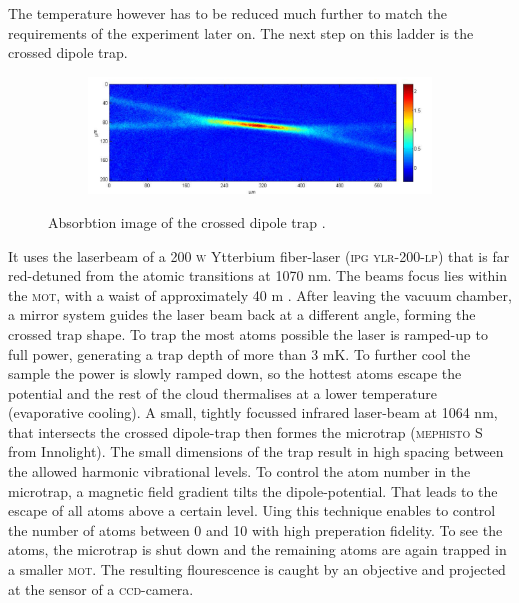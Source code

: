 The temperature however has to be reduced much further to match the requirements of the experiment later on. The next step on this ladder is the crossed dipole trap. \begin{figure}[h]
\centering
\begin{subfigure}[b]{0.8\textwidth}
                \includegraphics[width=\textwidth]{dipolefoto}
\end{subfigure}
\caption{Absorbtion image of the crossed dipole trap \cite{lompe}.}
\label{experiment}
\end{figure}
It uses the laserbeam of a 200 \textsc{w} Ytterbium fiber-laser (\textsc{ipg ylr-200-lp}) that is far red-detuned from the atomic transitions at 1070 nm. The beams focus lies within the \textsc{mot}, with a waist of approximately 40 \mu m \cite{lompe}. After leaving the vacuum chamber, a mirror system guides the laser beam back at a different angle, forming the crossed trap shape. To trap the most atoms possible the laser is ramped-up to full power, generating a trap depth of more than 3 mK. To further cool the sample the power is slowly ramped down, so the hottest atoms escape the potential and the rest of the cloud thermalises at a lower temperature (evaporative cooling). A small, tightly focussed infrared laser-beam at 1064 nm, that intersects the crossed dipole-trap then formes the microtrap (\textsc{mephisto S} from Innolight). The small dimensions of the trap result in high spacing between the allowed harmonic vibrational levels. To control the atom number in the microtrap, a magnetic field gradient tilts the dipole-potential. That leads to the escape of all atoms above a certain level. Uing this technique enables to control the number of atoms between 0 and 10 with high preperation fidelity. To see the atoms, the microtrap is shut down and the remaining atoms are again trapped in a smaller \textsc{mot}. The resulting flourescence is caught by an objective and projected at the sensor of a \textsc{ccd}-camera. 
